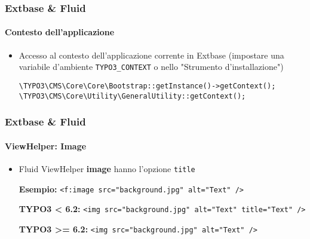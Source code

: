 
\begin{frame}[fragile]
	\frametitle{Extbase \& Fluid}
	\framesubtitle{Contesto dell'applicazione}

	\begin{itemize}
		\item Accesso al contesto dell'applicazione corrente in Extbase\newline
			(impostare una variabile d'ambiente \texttt{TYPO3\_CONTEXT} o nello "Strumento d'installazione")\newline

			\lstinline!\TYPO3\CMS\Core\Core\Bootstrap::getInstance()->getContext();!
			\lstinline!\TYPO3\CMS\Core\Utility\GeneralUtility::getContext();!

	\end{itemize}

\end{frame}


\begin{frame}[fragile]
	\frametitle{Extbase \& Fluid}
	\framesubtitle{ViewHelper: Image}

	\begin{itemize}
		\item Fluid ViewHelper \textbf{image} hanno l'opzione \texttt{title}\newline

			\smaller\textbf{Esempio:}\normalsize\newline
			\lstinline!<f:image src="background.jpg" alt="Text" />!
			\newline

			\smaller\textbf{TYPO3 < 6.2:}\normalsize\newline
			\lstinline!<img src="background.jpg" alt="Text" title="Text" />!
			\newline

			\smaller\textbf{TYPO3 >= 6.2:}\normalsize\newline
			\lstinline!<img src="background.jpg" alt="Text" />!

	\end{itemize}

\end{frame}

